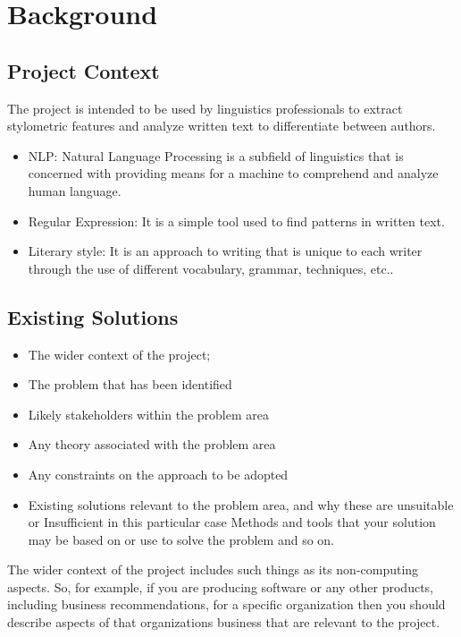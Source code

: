 \chapter{Background}

\section{Project Context}
The project is intended to be used by linguistics professionals to extract stylometric features and analyze written text to differentiate between authors.

\begin{itemize}
    \item NLP: Natural Language Processing is a subfield of linguistics that is concerned with providing means for a machine to comprehend and analyze human language.
    \item Regular Expression: It is a simple tool used to find patterns in written text.
    \item Literary style: It is an approach to writing that is unique to each writer through the use of different vocabulary, grammar, techniques, etc..
\end{itemize}

\section{Existing Solutions}

\begin{itemize}
    \item The wider context of the project;
    \item The problem that has been identified
    \item Likely stakeholders within the problem area
    \item Any theory associated with the problem area
    \item Any constraints on the approach to be adopted
    \item Existing solutions relevant to the problem area, and why these are unsuitable or Insufficient in this particular case Methods and tools that your solution may be based on or use to solve the problem and so on.
\end{itemize}
The wider context of the project includes such things as its non-computing aspects. So, for
example, if you are producing software or any other products, including business recommendations, for a specific organization then you should describe aspects of that organizations business that are relevant to the project.


